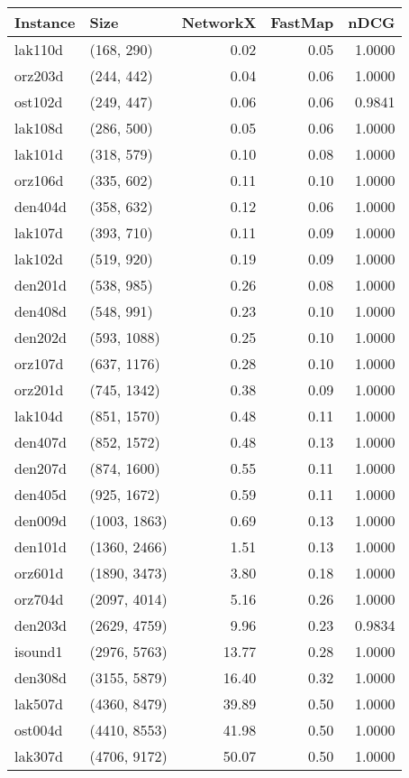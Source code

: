 \begin{tabular}{llrrr}
\toprule
Instance &         Size &  NetworkX &  FastMap &   nDCG \\
\midrule
 lak110d &   (168, 290) &      0.02 &     0.05 & 1.0000 \\
 orz203d &   (244, 442) &      0.04 &     0.06 & 1.0000 \\
 ost102d &   (249, 447) &      0.06 &     0.06 & 0.9841 \\
 lak108d &   (286, 500) &      0.05 &     0.06 & 1.0000 \\
 lak101d &   (318, 579) &      0.10 &     0.08 & 1.0000 \\
 orz106d &   (335, 602) &      0.11 &     0.10 & 1.0000 \\
 den404d &   (358, 632) &      0.12 &     0.06 & 1.0000 \\
 lak107d &   (393, 710) &      0.11 &     0.09 & 1.0000 \\
 lak102d &   (519, 920) &      0.19 &     0.09 & 1.0000 \\
 den201d &   (538, 985) &      0.26 &     0.08 & 1.0000 \\
 den408d &   (548, 991) &      0.23 &     0.10 & 1.0000 \\
 den202d &  (593, 1088) &      0.25 &     0.10 & 1.0000 \\
 orz107d &  (637, 1176) &      0.28 &     0.10 & 1.0000 \\
 orz201d &  (745, 1342) &      0.38 &     0.09 & 1.0000 \\
 lak104d &  (851, 1570) &      0.48 &     0.11 & 1.0000 \\
 den407d &  (852, 1572) &      0.48 &     0.13 & 1.0000 \\
 den207d &  (874, 1600) &      0.55 &     0.11 & 1.0000 \\
 den405d &  (925, 1672) &      0.59 &     0.11 & 1.0000 \\
 den009d & (1003, 1863) &      0.69 &     0.13 & 1.0000 \\
 den101d & (1360, 2466) &      1.51 &     0.13 & 1.0000 \\
 orz601d & (1890, 3473) &      3.80 &     0.18 & 1.0000 \\
 orz704d & (2097, 4014) &      5.16 &     0.26 & 1.0000 \\
 den203d & (2629, 4759) &      9.96 &     0.23 & 0.9834 \\
 isound1 & (2976, 5763) &     13.77 &     0.28 & 1.0000 \\
 den308d & (3155, 5879) &     16.40 &     0.32 & 1.0000 \\
 lak507d & (4360, 8479) &     39.89 &     0.50 & 1.0000 \\
 ost004d & (4410, 8553) &     41.98 &     0.50 & 1.0000 \\
 lak307d & (4706, 9172) &     50.07 &     0.50 & 1.0000 \\
\bottomrule
\end{tabular}
